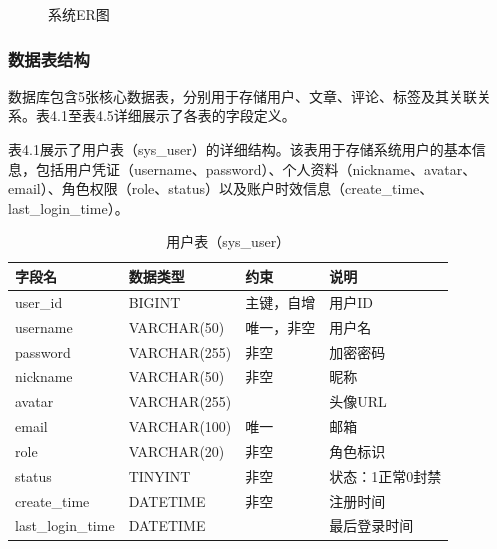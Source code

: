 \documentclass[UTF8,AutoFakeBold=1,AutoFakeSlant,zihao=-4]{SCAU}
\begin{document}
\begin{figure}[htbp]
\caption{系统ER图}
\label{fig:er}
\end{figure}

\subsubsection{数据表结构}

数据库包含5张核心数据表，分别用于存储用户、文章、评论、标签及其关联关系。表4.1至表4.5详细展示了各表的字段定义。

表4.1展示了用户表（sys\_user）的详细结构。该表用于存储系统用户的基本信息，包括用户凭证（username、password）、个人资料（nickname、avatar、email）、角色权限（role、status）以及账户时效信息（create\_time、last\_login\_time）。

\begin{table}[htbp]
\centering
\caption{用户表（sys\_user）}
\begin{tabular}{p{2.2cm}p{2.5cm}p{2cm}p{4.5cm}}
\toprule
字段名 & 数据类型 & 约束 & 说明 \\
\midrule
user\_id & BIGINT & 主键，自增 & 用户ID \\
username & VARCHAR(50) & 唯一，非空 & 用户名 \\
password & VARCHAR(255) & 非空 & 加密密码 \\
nickname & VARCHAR(50) & 非空 & 昵称 \\
avatar & VARCHAR(255) & & 头像URL \\
email & VARCHAR(100) & 唯一 & 邮箱 \\
role & VARCHAR(20) & 非空 & 角色标识 \\
status & TINYINT & 非空 & 状态：1正常0封禁 \\
create\_time & DATETIME & 非空 & 注册时间 \\
last\_login\_time & DATETIME & & 最后登录时间 \\
\bottomrule
\end{tabular}
\end{table}
\end{document}
